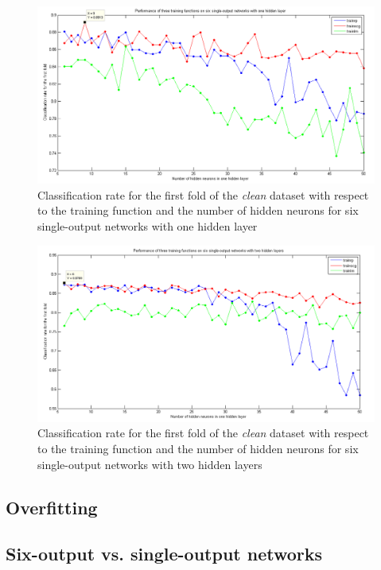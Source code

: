 \documentclass[a4paper]{article}
\begin{document}
\begin{figure}[!ht]
\center
\includegraphics[width=1\columnwidth]{singleOutput1layer}
\caption{Classification rate for the first fold of the \emph{clean} dataset with respect to the training function and the number of hidden neurons for six single-output networks with one hidden layer}
\label{singleOutput1layer}
\end{figure}

\begin{figure}[!ht]
\center
\includegraphics[width=1\columnwidth]{singleOutput2layer}
\caption{Classification rate for the first fold of the \emph{clean} dataset with respect to the training function and the number of hidden neurons for six single-output networks with two hidden layers}
\label{singleOutput2layer}
\end{figure}

\subsection{Overfitting}
\subsection{Six-output vs. single-output networks}
\end{document}
